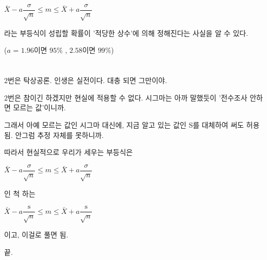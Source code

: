 ﻿\documentclass{oblivoir}
\begin{document}
$\bar{X} - a\dfrac{\sigma}{\sqrt{n}}\le m \le \bar{X} + a\dfrac{\sigma}{\sqrt{n}}$
\par
라는 부등식이 성립할 확률이 '적당한 상수'에 의해 정해진다는 사실을 알 수 있다.\par
($a$ = $1.96$이면 $95\%$ , $2.58$이면 $99\%$)
\par\par

\section{}
2번은 탁상공론. 인생은 실전이다. 대충 되면 그만이야.\par
2번은 참이긴 하겠지만 현실에 적용할 수 없다. 시그마는 아까 말했듯이 '전수조사 안하면 모르는 값'이니까.\par
그래서 아예 모르는 값인 시그마 대신에, 지금 알고 있는 값인 S를 대체하여 써도 허용됨. 안그럼 추정 자체를 못하니까.\par
\par
따라서 현실적으로 우리가 세우는 부등식은\par
\par
$\bar{X} - a\dfrac{\sigma}{\sqrt{n}}\le m \le \bar{X} + a\dfrac{\sigma}{\sqrt{n}}$\par
인 척 하는\par
$\bar{X} - a\dfrac{\mathrm{s}}{\sqrt{n}}\le m \le \bar{X} + a\dfrac{\mathrm{s}}{\sqrt{n}}$\par
이고, 이걸로 풀면 됨.\par
\par
끝.
\end{document}
